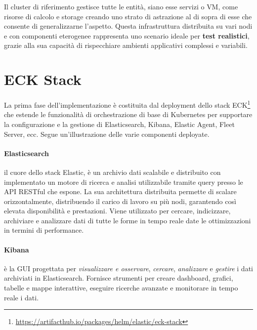 Il cluster di riferimento gestisce tutte le entità, siano esse servizi o \gls{VM}, come risorse di calcolo e storage creando uno strato di astrazione al di sopra di esse che consente di generalizzarne l'aspetto. Questa infrastruttura distribuita su vari nodi e con componenti eterogenee rappresenta uno scenario ideale per \textbf{test realistici}, grazie alla sua capacità di rispecchiare ambienti applicativi complessi e variabili.

\section{ECK Stack}
La prima fase dell'implementazione è costituita dal deployment dello stack \gls{ECK}\footnote{\url{https://artifacthub.io/packages/helm/elastic/eck-stack}} che estende le funzionalità di orchestrazione di base di Kubernetes per supportare la configurazione e la gestione di Elasticsearch, Kibana, Elastic Agent, Fleet Server, ecc.
Segue un'illustrazione delle varie componenti deployate.

\paragraph{Elasticsearch}
il cuore dello stack Elastic, è un archivio dati scalabile e distribuito con implementato un motore di ricerca e analisi utilizzabile tramite query presso le \gls{API} RESTful che espone. La sua architettura distribuita permette di scalare orizzontalmente, distribuendo il carico di lavoro su più nodi, garantendo così elevata disponibilità e prestazioni.
Viene utilizzato per cercare, indicizzare, archiviare e analizzare dati di tutte le forme in tempo reale date le ottimizzazioni in termini di performance.

\paragraph{Kibana}
è la \gls{GUI} progettata per \emph{visualizzare e osservare}, \emph{cercare}, \emph{analizzare} e \emph{gestire} i dati archiviati in Elasticsearch. Fornisce strumenti per creare dashboard, grafici, tabelle e mappe interattive, eseguire ricerche avanzate e monitorare in tempo reale i dati.

